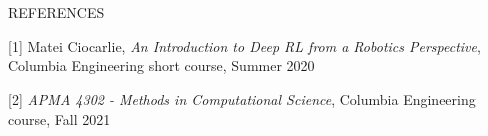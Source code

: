 \documentclass[12pt]{article}
\begin{document}
~\\~

\centerline{REFERENCES}

[1] Matei Ciocarlie, \textit{An Introduction to Deep RL from a Robotics Perspective},
Columbia Engineering short course, Summer 2020

[2] \textit{APMA 4302 - Methods in Computational Science},
Columbia Engineering course, Fall 2021
\end{document}
